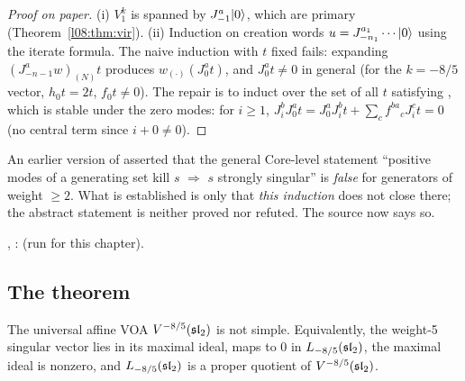 \begin{proof}[Proof on paper]
(i) $V^k_1$ is spanned by $J^a_{-1}|0\rangle$, which are primary (Theorem~\ref{l08:thm:vir}).
(ii) Induction on creation words $u = J^{a_1}_{-n_1}\cdots|0\rangle$ using the iterate formula. The naive
induction with $t$ fixed fails: expanding $(J^a_{-n-1}w)_{(N)}t$ produces $w_{(\cdot)}(J^a_0t)$, and $J^a_0t\ne0$ in
general (for the $k=-8/5$ vector, $h_0t=2t$, $f_0t\ne0$). The repair is to induct over the set of all
$t$ satisfying , which is stable under the zero modes: for $i\ge1$,
$J^b_iJ^a_0t = J^a_0J^b_it + \sum_cf^{ba}{}_cJ^c_it = 0$ (no central term since $i+0\ne0$).
\end{proof}

\begin{warning}[title={An overclaim corrected in the source}]
An earlier version of  asserted that the general Core-level statement
``positive modes of a generating set kill $s$ $\Rightarrow$ $s$ strongly singular'' is \emph{false} for
generators of weight $\ge2$. What is established is only that \emph{this induction} does not close
there; the abstract statement is neither proved nor refuted. The source now says so.
\end{warning}

\begin{status}
\allowbreak{}\allowbreak{}\allowbreak{}\allowbreak{}, \allowbreak{}\allowbreak{}\allowbreak{}\allowbreak{}\allowbreak{}:
\lean{[propext, Classical.}\allowbreak{}\allowbreak\lean{sound]} (run for this chapter).
\end{status}

\subsection{The theorem}

\begin{theorem}\label{l08:thm:notsimple}
The universal affine VOA $V^{-8/5}(\mathfrak{sl}_2)$ is not simple. Equivalently, the weight-5 singular
vector lies in its maximal ideal, maps to $0$ in $L_{-8/5}(\mathfrak{sl}_2)$, the maximal ideal is nonzero,
and $L_{-8/5}(\mathfrak{sl}_2)$ is a proper quotient of $V^{-8/5}(\mathfrak{sl}_2)$.
\end{theorem}

